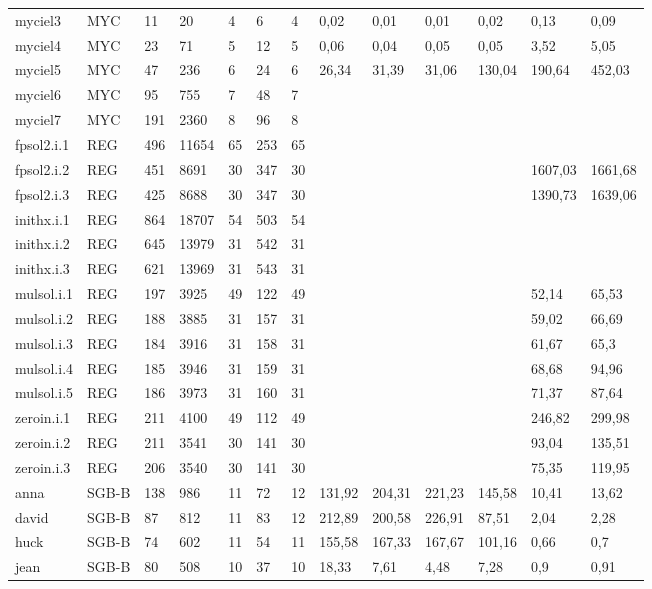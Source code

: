 \documentclass{sig-alternate}
\begin{document}
\begin{table}[b]
{\begin{tabular}{lllllllllllll}
myciel3 & MYC & 11 & 20 & 4 & 6 & 4 & 0,02 & 0,01 & 0,01 & 0,02 & 0,13 & 0,09 \\
myciel4 & MYC & 23 & 71 & 5 & 12 & 5 & 0,06 & 0,04 & 0,05 & 0,05 & 3,52 & 5,05 \\
myciel5 & MYC & 47 & 236 & 6 & 24 & 6 & 26,34 & 31,39 & 31,06 & 130,04 & 190,64 & 452,03 \\
myciel6 & MYC & 95 & 755 & 7 & 48 & 7 &  &  &  &  &  &  \\
myciel7 & MYC & 191 & 2360 & 8 & 96 & 8 &  &  &  &  &  &  \\
fpsol2.i.1 & REG & 496 & 11654 & 65 & 253 & 65 &  &  &  &  &  &  \\
fpsol2.i.2 & REG & 451 & 8691 & 30 & 347 & 30 &  &  &  &  & 1607,03 & 1661,68 \\
fpsol2.i.3 & REG & 425 & 8688 & 30 & 347 & 30 &  &  &  &  & 1390,73 & 1639,06 \\
inithx.i.1 & REG & 864 & 18707 & 54 & 503 & 54 &  &  &  &  &  &  \\
inithx.i.2 & REG & 645 & 13979 & 31 & 542 & 31 &  &  &  &  &  &  \\
inithx.i.3 & REG & 621 & 13969 & 31 & 543 & 31 &  &  &  &  &  &  \\
mulsol.i.1 & REG & 197 & 3925 & 49 & 122 & 49 &  &  &  &  & 52,14 & 65,53 \\
mulsol.i.2 & REG & 188 & 3885 & 31 & 157 & 31 &  &  &  &  & 59,02 & 66,69 \\
mulsol.i.3 & REG & 184 & 3916 & 31 & 158 & 31 &  &  &  &  & 61,67 & 65,3 \\
mulsol.i.4 & REG & 185 & 3946 & 31 & 159 & 31 &  &  &  &  & 68,68 & 94,96 \\
mulsol.i.5 & REG & 186 & 3973 & 31 & 160 & 31 &  &  &  &  & 71,37 & 87,64 \\
zeroin.i.1 & REG & 211 & 4100 & 49 & 112 & 49 &  &  &  &  & 246,82 & 299,98 \\
zeroin.i.2 & REG & 211 & 3541 & 30 & 141 & 30 &  &  &  &  & 93,04 & 135,51 \\
zeroin.i.3 & REG & 206 & 3540 & 30 & 141 & 30 &  &  &  &  & 75,35 & 119,95 \\
anna & SGB-B & 138 & 986 & 11 & 72 & 12 & 131,92 & 204,31 & 221,23 & 145,58 & 10,41 & 13,62 \\
david & SGB-B & 87 & 812 & 11 & 83 & 12 & 212,89 & 200,58 & 226,91 & 87,51 & 2,04 & 2,28 \\
huck & SGB-B & 74 & 602 & 11 & 54 & 11 & 155,58 & 167,33 & 167,67 & 101,16 & 0,66 & 0,7 \\
jean & SGB-B & 80 & 508 & 10 & 37 & 10 & 18,33 & 7,61 & 4,48 & 7,28 & 0,9 & 0,91 \\

\end{tabular}}
\end{table}
\end{document}
